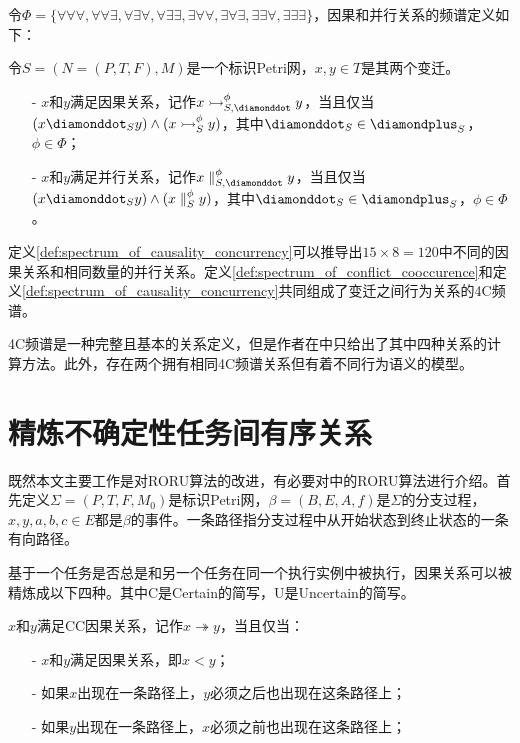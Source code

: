 令$\Phi=\{\forall\forall\forall,\forall\forall\exists,\forall\exists\forall,\forall\exists\exists,\exists\forall\forall,\exists\forall\exists,\exists\exists\forall,\exists\exists\exists\}$，因果和并行关系的频谱定义如下：
\begin{definition}[因果和并行关系的频谱]\label{def:spectrum_of_causality_concurrency}
令$S=(N=(P,T,F),M)$是一个标识Petri网，$x,y\in T$是其两个变迁。
  \begin{itemize}
    \item[-] $x$和$y$满足因果关系，记作$x\rightarrowtail_{S,\diamonddot}^{\phi}y$，当且仅当\\
    $(x\diamonddot_{S}y)\wedge(x\rightarrowtail_{S}^{\phi}y)$，其中$\diamonddot_{S}\in\diamondplus_{S}$，$\phi\in\Phi$；
    \item[-] $x$和$y$满足并行关系，记作$x\parallel_{S,\diamonddot}^{\phi}y$，当且仅当\\
    $(x\diamonddot_{S}y)\wedge(x\parallel_{S}^{\phi}y)$，其中$\diamonddot_{S}\in\diamondplus_{S}$，$\phi\in\Phi$。
  \end{itemize}
\end{definition}
定义\ref{def:spectrum_of_causality_concurrency}可以推导出$15\times 8=120$中不同的因果关系和相同数量的并行关系。定义\ref{def:spectrum_of_conflict_cooccurence}和定义\ref{def:spectrum_of_causality_concurrency}共同组成了变迁之间行为关系的4C频谱。

4C频谱是一种完整且基本的关系定义，但是作者在中只给出了其中四种关系的计算方法。此外，存在两个拥有相同4C频谱关系但有着不同行为语义的模型\cite{armas2014suitability}。

\section{精炼不确定性任务间有序关系}\label{sec:roru}
既然本文主要工作是对RORU算法的改进，有必要对中的RORU算法进行介绍。首先定义$\Sigma=(P,T,F,M_{0})$是标识Petri网，$\beta=(B,E,A,f)$是$\Sigma$的分支过程，$x,y,a,b,c\in E$都是$\beta$的事件。一条路径指分支过程中从开始状态到终止状态的一条有向路径。

基于一个任务是否总是和另一个任务在同一个执行实例中被执行，因果关系可以被精炼成以下四种。其中C是Certain的简写，U是Uncertain的简写。

\begin{definition}\label{def:c_c_causal}
$x$和$y$满足CC因果关系，记作$x\twoheadrightarrow y$，当且仅当：
  \begin{itemize}
    \item[-] $x$和$y$满足因果关系，即$x<y$；
    \item[-] 如果$x$出现在一条路径上，$y$必须之后也出现在这条路径上；
    \item[-] 如果$y$出现在一条路径上，$x$必须之前也出现在这条路径上；
  \end{itemize}
\end{definition}


